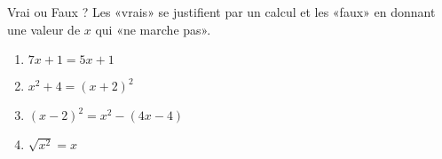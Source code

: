 
\begin{exercice}\label{exosmath-0042}

    Vrai ou Faux ? Les «vrais» se justifient par un calcul et les «faux» en donnant une valeur de \( x\) qui «ne marche pas».
    \begin{multicols}{2}
        \begin{enumerate}
            \item
                \( 7x+1=5x+1\)
            \item
                \( x^2+4=(x+2)^2\)
            \item
                \( (x-2)^2=x^2-(4x-4)\)
            \item
                \( \sqrt{x^2}=x\)
        \end{enumerate}
    \end{multicols}

\end{exercice}
